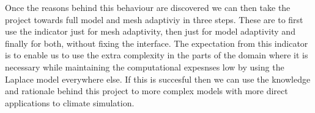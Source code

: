\documentclass[12pt,a4paper]{article}
\theoremstyle{definition}
\begin{document}
Once the reasons behind this behaviour are discovered we can then take the project towards full model and mesh adaptiviy in three steps.  These are to first use the indicator just for mesh adaptivity, then just for model adaptivity and finally for both,  without fixing the interface.  The expectation from this indicator is to enable us to use the extra complexity in the parts of the domain where it is necessary while maintaining the computational expesnses low by using the Laplace model everywhere else.  If this is succesful then we can use the knowledge and rationale behind this project to more complex models with more direct applications to climate simulation.



\end{document}
